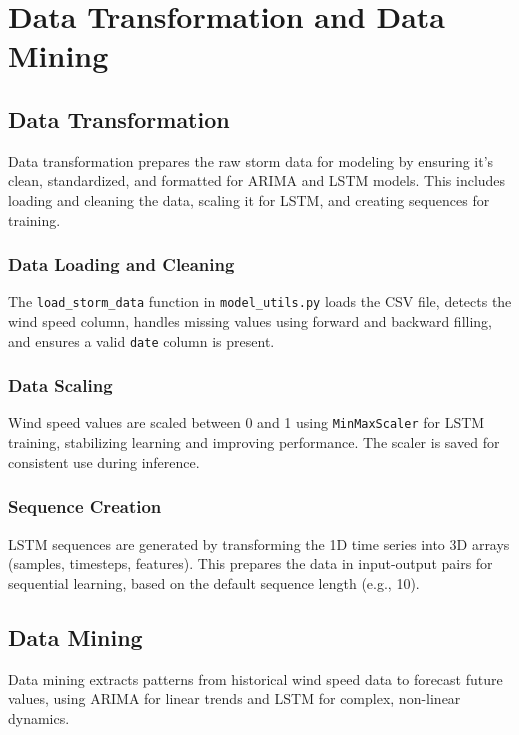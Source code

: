 %
%
%

\chapter{Data Transformation and Data Mining}

\section{Data Transformation}
Data transformation prepares the raw storm data for modeling by ensuring it’s clean, standardized, and formatted for ARIMA and LSTM models. This includes loading and cleaning the data, scaling it for LSTM, and creating sequences for training.

\subsection{Data Loading and Cleaning}
The \texttt{load\_storm\_data} function in \texttt{model\_utils.py} loads the CSV file, detects the wind speed column, handles missing values using forward and backward filling, and ensures a valid \texttt{date} column is present.

\subsection{Data Scaling}
Wind speed values are scaled between 0 and 1 using \texttt{MinMaxScaler} for LSTM training, stabilizing learning and improving performance. The scaler is saved for consistent use during inference.

\subsection{Sequence Creation}
LSTM sequences are generated by transforming the 1D time series into 3D arrays (samples, timesteps, features). This prepares the data in input-output pairs for sequential learning, based on the default sequence length (e.g., 10).

\section{Data Mining}
Data mining extracts patterns from historical wind speed data to forecast future values, using ARIMA for linear trends and LSTM for complex, non-linear dynamics.

